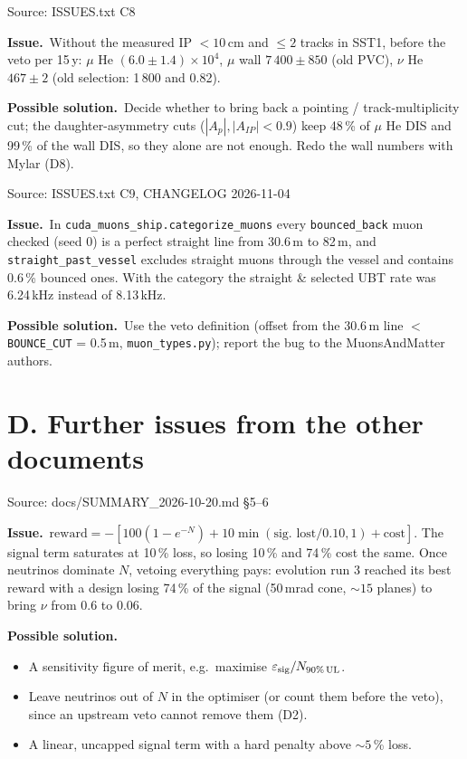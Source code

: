 \documentclass[10pt,a4paper]{article}
\newcommand{\st}[1]{\textbf{#1}}
\newcommand{\stOPEN}{\textcolor{shorange}{\st{OPEN}}}
\newenvironment{issue}[5]{%
  \begin{tcolorbox}[breakable,colback=white,colframe=cernblue,boxrule=0.6pt,arc=1.5mm,
    left=6pt,right=6pt,top=4pt,bottom=4pt,
    title={\textbf{#1}\quad #2\hfill{\normalfont\small priority #3\quad\colorbox{white}{#4}}},
    coltitle=white,colbacktitle=cernblue,fonttitle=\normalsize]
  {\color{greytxt}\footnotesize Source: #5}\par\smallskip}{\end{tcolorbox}\vspace{2pt}}
\newcommand{\prob}{\par\noindent\textbf{\color{cernblue}Issue.}\ }
\newcommand{\sol}{\par\smallskip\noindent\textbf{\color{shorange}Possible solution.}\ }
\begin{document}
\begin{issue}{C8}{DIS rates with the new selection}{C}{\stOPEN}{ISSUES.txt C8}
\prob Without the measured IP $<10$\,cm and $\le2$ tracks in SST1, before the veto per 15\,y:
$\mu$ He $(6.0\pm1.4)\times10^4$, $\mu$ wall $7\,400\pm850$ (old PVC), $\nu$ He $467\pm2$
(old selection: 1\,800 and 0.82).
\sol Decide whether to bring back a pointing / track-multiplicity cut; the daughter-asymmetry cuts
($|A_p|,|A_{IP}|<0.9$) keep 48\,\% of $\mu$ He DIS and 99\,\% of the wall DIS, so they alone are not enough.
Redo the wall numbers with Mylar (D8).
\end{issue}

\begin{issue}{C9}{shah\_study categories: bounce flag not reliable}{C}{\stOPEN}{ISSUES.txt C9, CHANGELOG 2026-11-04}
\prob In \texttt{cuda\_muons\_ship.categorize\_muons} every \texttt{bounced\_back} muon checked (seed 0) is a perfect
straight line from 30.6\,m to 82\,m, and \texttt{straight\_past\_vessel} excludes straight muons through the vessel
and contains 0.6\,\% bounced ones. With the category the straight \& selected UBT rate was 6.24\,kHz instead of
8.13\,kHz.
\sol Use the veto definition (offset from the 30.6\,m line $<$ \texttt{BOUNCE\_CUT} = 0.5\,m,
\texttt{muon\_types.py}); report the bug to the MuonsAndMatter authors.
\end{issue}

\section*{D. Further issues from the other documents}

\begin{issue}{D1}{Objective exploitable: signal term saturates}{A}{\stOPEN}{docs/SUMMARY\_2026-10-20.md \S5--6}
\prob $\text{reward}=-[100(1-e^{-N})+10\min(\text{sig.\ lost}/0.10,1)+\text{cost}]$. The signal term saturates at
10\,\% loss, so losing 10\,\% and 74\,\% cost the same. Once neutrinos dominate $N$, vetoing everything pays:
evolution run 3 reached its best reward with a design losing 74\,\% of the signal (50\,mrad cone, $\sim15$ planes)
to bring $\nu$ from 0.6 to 0.06.
\sol
\begin{itemize}
\item A sensitivity figure of merit, e.g.\ maximise $\varepsilon_{\rm sig}/N_{90\%\,\rm UL}$.
\item Leave neutrinos out of $N$ in the optimiser (or count them before the veto), since an upstream veto
      cannot remove them (D2).
\item A linear, uncapped signal term with a hard penalty above $\sim5$\,\% loss.
\end{itemize}
\end{issue}
\end{document}
